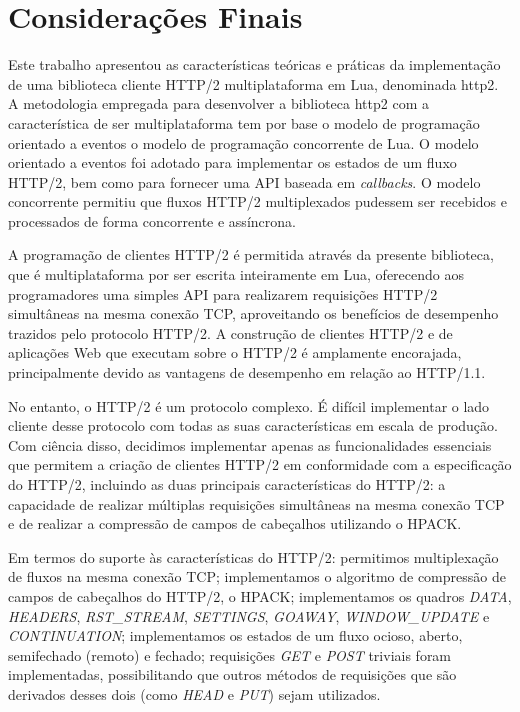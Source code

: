 \chapter{Considerações Finais}
\label{cap:conclusion}

Este trabalho apresentou as características teóricas e práticas da implementação de uma biblioteca cliente HTTP/2 multiplataforma em Lua, denominada http2. A metodologia empregada para desenvolver a biblioteca http2 com a característica de ser multiplataforma tem por base o modelo de programação orientado a eventos o modelo de programação concorrente de Lua. O modelo orientado a eventos foi adotado para implementar os estados de um fluxo HTTP/2, bem como para fornecer uma API baseada em {\em callbacks}. O modelo concorrente permitiu que fluxos HTTP/2 multiplexados pudessem ser recebidos e processados de forma concorrente e assíncrona.

A programação de clientes HTTP/2 é permitida através da presente biblioteca, que é multiplataforma por ser escrita inteiramente em Lua, oferecendo aos programadores uma simples API para realizarem requisições HTTP/2 simultâneas na mesma conexão TCP, aproveitando os benefícios de desempenho trazidos pelo protocolo HTTP/2. A construção de clientes HTTP/2 e de aplicações Web que executam sobre o HTTP/2 é amplamente encorajada, principalmente devido as vantagens de desempenho em relação ao HTTP/1.1.

No entanto, o HTTP/2 é um protocolo complexo. É difícil implementar o lado cliente desse protocolo com todas as suas características em escala de produção. Com ciência disso, decidimos implementar apenas as funcionalidades essenciais que permitem a criação de clientes HTTP/2 em conformidade com a especificação do HTTP/2, incluindo as duas principais características do HTTP/2: a capacidade de realizar múltiplas requisições simultâneas na mesma conexão TCP e de realizar a compressão de campos de cabeçalhos utilizando o HPACK.

Em termos do suporte às características do HTTP/2: permitimos multiplexação de fluxos na mesma conexão TCP; implementamos o algoritmo de compressão de campos de cabeçalhos do HTTP/2, o HPACK; implementamos os quadros {\em DATA}, {\em HEADERS}, {\em RST\_STREAM}, {\em SETTINGS}, {\em GOAWAY}, {\em WINDOW\_UPDATE} e {\em CONTINUATION}; implementamos os estados de um fluxo ocioso, aberto, semifechado (remoto) e fechado; requisições {\em GET} e {\em POST} triviais foram implementadas, possibilitando que outros métodos de requisições que são derivados desses dois (como {\em HEAD} e {\em PUT}) sejam utilizados.

